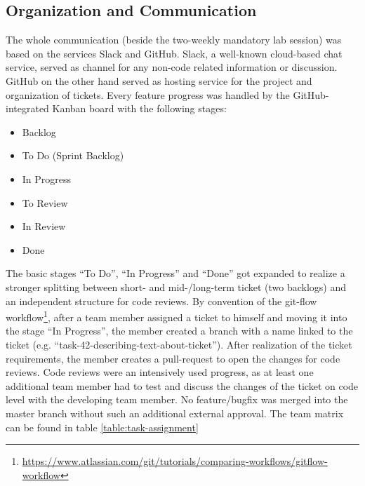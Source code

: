 \subsection{Organization and Communication}
The whole communication (beside the two-weekly mandatory lab session) was based on the services Slack and GitHub. Slack, a well-known cloud-based chat service, served as channel for any non-code related information or discussion. GitHub on the other hand served as hosting service for the project and organization of tickets. Every feature progress was handled by the GitHub-integrated Kanban board with the following stages:
\begin{itemize}
	\item Backlog
	\item To Do (Sprint Backlog)
	\item In Progress
	\item To Review
	\item In Review
	\item Done
\end{itemize}
The basic stages “To Do”, “In Progress” and “Done” got expanded to realize a stronger splitting between short- and mid-/long-term ticket (two backlogs) and an independent structure for code reviews.
By convention of the git-flow workflow\footnote{\url{https://www.atlassian.com/git/tutorials/comparing-workflows/gitflow-workflow}}, after a team member assigned a ticket to himself and moving it into the stage “In Progress”, the member created a branch with a name linked to the ticket (e.g. “task-42-describing-text-about-ticket”). After realization of the ticket requirements, the member creates a pull-request to open the changes for code reviews.
Code reviews were an intensively used progress, as at least one additional team member had to test and discuss the changes of the ticket on code level with the developing team member. No feature/bugfix was merged into the master branch without such an additional external approval. The team matrix can be found in table \ref{table:task-assignment}

